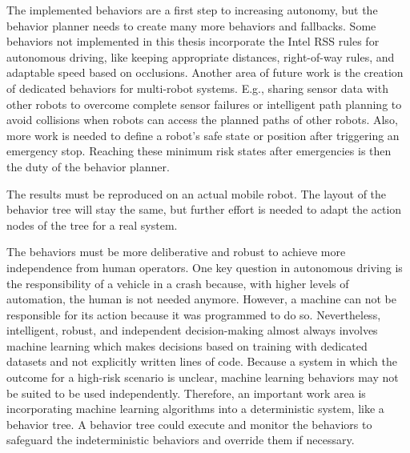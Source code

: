 The implemented behaviors are a first step to increasing autonomy, but the behavior planner needs to create many more behaviors and fallbacks. Some behaviors not implemented in this thesis incorporate the Intel RSS rules for autonomous driving, like keeping appropriate distances, right-of-way rules, and adaptable speed based on occlusions.
Another area of future work is the creation of dedicated behaviors for multi-robot systems. E.g., sharing sensor data with other robots to overcome complete sensor failures or intelligent path planning to avoid collisions when robots can access the planned paths of other robots. 
Also, more work is needed to define a robot's safe state or position after triggering an emergency stop. Reaching these minimum risk states after emergencies is then the duty of the behavior planner.

The results must be reproduced on an actual mobile robot. The layout of the behavior tree will stay the same, but further effort is needed to adapt the action nodes of the tree for a real system. 

The behaviors must be more deliberative and robust to achieve more independence from human operators. One key question in autonomous driving is the responsibility of a vehicle in a crash because, with higher levels of automation, the human is not needed anymore. However, a machine can not be responsible for its action because it was programmed to do so. Nevertheless, intelligent, robust, and independent decision-making almost always involves machine learning which makes decisions based on training with dedicated datasets and not explicitly written lines of code. Because a system in which the outcome for a high-risk scenario is unclear, machine learning behaviors may not be suited to be used independently. Therefore, an important work area is incorporating machine learning algorithms into a deterministic system, like a behavior tree. A behavior tree could execute and monitor the behaviors to safeguard the indeterministic behaviors and override them if necessary.

 
